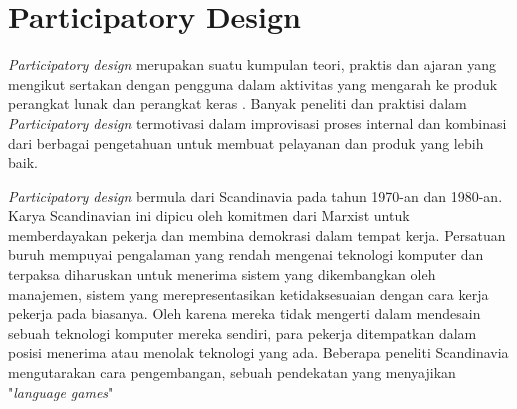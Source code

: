 \section{Participatory Design}
\textit{Participatory design} merupakan suatu kumpulan teori, praktis dan ajaran yang mengikut sertakan dengan pengguna dalam aktivitas yang mengarah ke produk perangkat lunak dan perangkat keras \citep{participatory}. Banyak peneliti dan praktisi dalam \textit{Participatory design} termotivasi dalam improvisasi proses internal dan kombinasi dari berbagai pengetahuan untuk membuat pelayanan dan produk yang lebih baik.

\textit{Participatory design} bermula dari Scandinavia pada tahun 1970-an dan 1980-an. Karya Scandinavian ini dipicu oleh komitmen dari Marxist untuk memberdayakan pekerja dan membina demokrasi dalam tempat kerja. Persatuan buruh mempuyai pengalaman yang rendah mengenai teknologi komputer dan terpaksa diharuskan untuk menerima sistem yang dikembangkan oleh manajemen, sistem yang merepresentasikan ketidaksesuaian dengan cara kerja pekerja pada biasanya. Oleh karena mereka tidak mengerti dalam mendesain sebuah teknologi komputer mereka sendiri, para pekerja ditempatkan dalam posisi menerima atau menolak teknologi yang ada. Beberapa peneliti Scandinavia mengutarakan cara pengembangan, sebuah pendekatan yang menyajikan "\textit{language games}"

